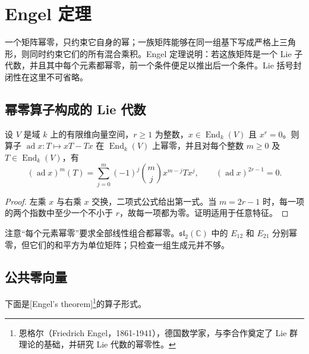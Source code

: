 
\section{Engel 定理}
\label{b5:sec:1201}

%
%

一个矩阵幂零，只约束它自身的幂；一族矩阵能够在同一组基下写成严格上三角形，则同时约束它们的所有混合乘积。Engel 定理说明：若这族矩阵是一个 Lie 子代数，并且其中每个元素都幂零，前一个条件便足以推出后一个条件。Lie 括号封闭性在这里不可省略。

\subsection{幂零算子构成的 Lie 代数}
\label{b5:subsec:1201:01}

\begin{lemma}\label{b5:lem:ad-of-nilpotent-matrix}
	设 \(V\) 是域 \(k\) 上的有限维向量空间，\(r\ge1\) 为整数，\(x\in\operatorname{End}_k(V)\) 且 \(x^r=0\)。则算子 \(\operatorname{ad}x:T\mapsto xT-Tx\) 在 \(\operatorname{End}_k(V)\) 上幂零，并且对每个整数 \(m\ge0\) 及 \(T\in\operatorname{End}_k(V)\)，有
	\[
		(\operatorname{ad}x)^m(T) =\sum_{j=0}^{m}(-1)^j\binom mj x^{m-j}Tx^j,\qquad (\operatorname{ad}x)^{2r-1}=0.
	\]
\end{lemma}
\begin{proof}
	左乘 \(x\) 与右乘 \(x\) 交换，二项式公式给出第一式。当 \(m=2r-1\) 时，每一项的两个指数中至少一个不小于 \(r\)，故每一项都为零。证明适用于任意特征。
\end{proof}

注意“每个元素幂零”要求全部线性组合都幂零。\(\mathfrak{sl}_2(\mathbb C)\) 中的 \(E_{12}\) 和 \(E_{21}\) 分别幂零，但它们的和平方为单位矩阵；只检查一组生成元并不够。

\subsection{公共零向量}
\label{b5:subsec:1201:02}

下面是[Engel's theorem]\footnote{恩格尔（Friedrich Engel，1861-1941），德国数学家，与李合作奠定了 Lie 群理论的基础，并研究 Lie 代数的幂零性。}的算子形式。


